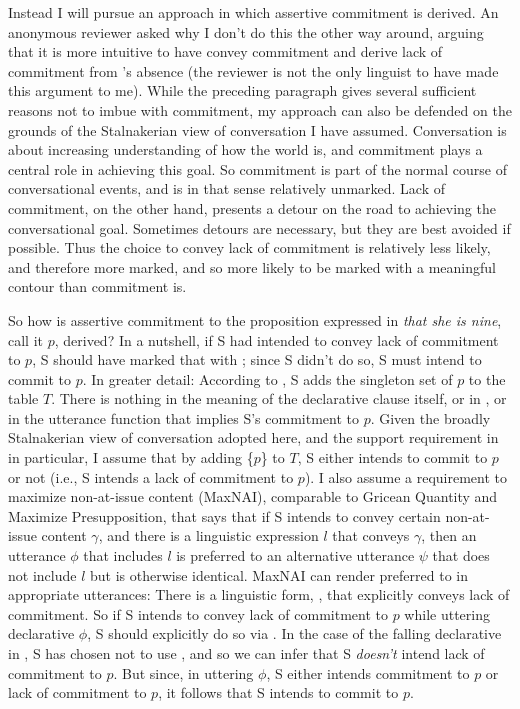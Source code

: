 \documentclass[output=paper,colorlinks,citecolor=brown]{langscibook}
\begin{document}
	Instead I will pursue an approach in which assertive commitment is derived. An anonymous reviewer asked why I don't do this the other way around, arguing that it is more intuitive to have \fall convey commitment and derive lack of commitment from \fall's absence (the reviewer is not the only linguist to have made this argument to me). While the preceding paragraph gives several sufficient reasons not to imbue \fall with commitment, my approach can also be defended on the grounds of the Stalnakerian view of conversation I have assumed. Conversation is about increasing understanding of how the world is, and commitment plays a central role in achieving this goal. So commitment is part of the normal course of conversational events, and is in that sense relatively unmarked. Lack of commitment, on the other hand, presents a detour on the road to achieving the conversational goal. Sometimes detours are necessary, but they are best avoided if possible. Thus the choice to convey lack of commitment is relatively less likely, and therefore more marked, and so more likely to be marked with a meaningful contour than commitment is. 
	
	
	
	So how is assertive commitment to the proposition expressed in  \emph{that she is nine}, call it $p$, derived? In a nutshell, if S had intended to convey lack of commitment to $p$, S should have marked that with \rise; since S didn't do so, S must intend to commit to $p$. In greater detail: According to , S adds the singleton set of  $p$ to the table $T$. There is nothing in the meaning of the declarative clause itself, or in \fall, or in the utterance function that implies S's commitment to $p$. Given the broadly Stalnakerian view of conversation adopted here, and the support requirement in  in particular, I assume that by adding \{$p$\} to $T$, S either intends to commit to $p$ or not (i.e., S intends a lack of commitment to $p$). I also assume a requirement to maximize non-at-issue content (MaxNAI), comparable to Gricean Quantity and Maximize Presupposition, that says that if S intends to convey certain non-at-issue content $\gamma$, and there is a linguistic expression $l$ that conveys $\gamma$, then an utterance $\phi$ that includes $l$ is preferred to an alternative utterance $\psi$ that does not include $l$ but is otherwise identical. MaxNAI can render \rise preferred to \fall in appropriate utterances: There is a linguistic form, \rise, that explicitly conveys lack of commitment. So if S intends to convey lack of commitment to $p$ while uttering declarative $\phi$, S should explicitly do so via \rise. In the case of the falling declarative in , S has  chosen not to use \rise, and so we can infer that S \emph{doesn't} intend lack of commitment to $p$. But since, in uttering $\phi$, S either intends commitment to $p$ or lack of commitment to $p$, it follows that S intends to commit to $p$. 
	
\end{document}
